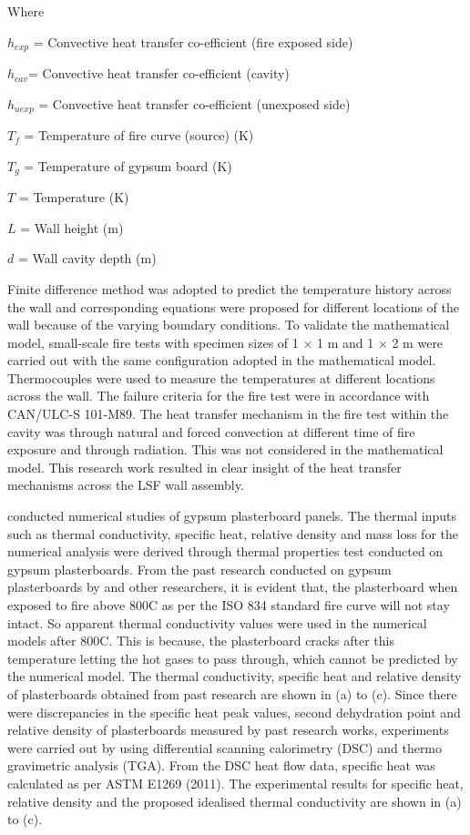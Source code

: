Where
\begin{description}[itemsep=0pt,parsep=0pt]
	\item $ h_{exp} $ = Convective heat transfer co-efficient (fire exposed side)
	\item $ h_{cav} $= Convective heat transfer co-efficient (cavity) 
	\item $ h_{u exp} $ = Convective heat transfer co-efficient (unexposed side) 
	\item $ T_f $ = Temperature of fire curve (source) (\degree K)
	\item $ T_g $ = Temperature of gypsum board (\degree K)
	\item $T$ = Temperature (\degree K)
	\item $L$ = Wall height (m)
	\item $d$ = Wall cavity depth (m)
\end{description}
Finite difference method was adopted to predict the temperature history across the wall and corresponding equations were proposed for different locations of the wall because of the varying boundary conditions. To validate the mathematical model, small-scale fire tests with specimen sizes of 1 $\times$ 1 m and 1 $\times$ 2 m were carried out with the same configuration adopted in the mathematical model. Thermocouples were used to measure the temperatures at different locations across the wall. The failure criteria for the fire test were in accordance with CAN/ULC-S 101-M89. The heat transfer mechanism in the fire test within the cavity was through natural and forced convection at different time of fire exposure and through radiation. This was not considered in the mathematical model. This research work resulted in clear insight of the heat transfer mechanisms across the LSF wall assembly. 

\citet{Keerthan2012a} conducted numerical studies of gypsum plasterboard panels. The thermal inputs such as thermal conductivity, specific heat, relative density and mass loss for the numerical analysis were derived through thermal properties test conducted on gypsum plasterboards. From the past research conducted on gypsum plasterboards by \citet{Mehaffey1994,Sultan1996} and other researchers, it is evident that, the plasterboard when exposed to fire above 800\degree C as per the ISO 834 standard fire curve will not stay intact. So apparent thermal conductivity values were used in the numerical models after 800\degree C. This is because, the plasterboard cracks after this temperature letting the hot gases to pass through, which cannot be predicted by the numerical model. The thermal conductivity, specific heat and relative density of plasterboards obtained from past research are shown in  (a) to (c). Since there were discrepancies in the specific heat peak values, second dehydration point and relative density of plasterboards measured by past research works, experiments were carried out by \citet{Keerthan2012} using differential scanning calorimetry (DSC) and thermo gravimetric analysis (TGA). From the DSC heat flow data, specific heat was calculated as per ASTM E1269 (2011). The experimental results for specific heat, relative density and the proposed idealised thermal conductivity are shown in  (a) to (c).

